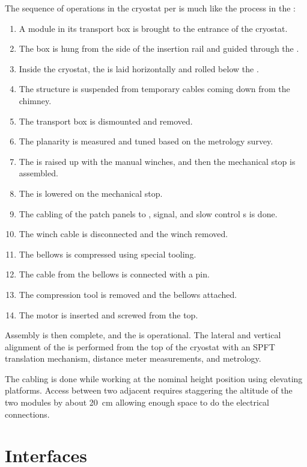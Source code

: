 The sequence of operations in the cryostat per  is much like the process in the : 
\begin{enumerate}
\item A  module in its transport box is brought to the entrance of the cryostat.
\item The box is hung from the side of the insertion rail and guided through the .
\item  Inside the cryostat, the  is laid horizontally and rolled below the .
\item The structure is suspended from temporary cables coming down from the chimney.
\item The transport box is dismounted and removed.
\item The  planarity is measured and tuned based on the metrology survey.
\item The  is raised up with the manual winches, and then the mechanical stop is assembled.
\item The  is lowered on the mechanical stop.
\item The cabling of the  patch panels to , signal, and slow control \fdth{}s is done.
\item The winch cable is disconnected  and the winch removed.
\item The bellows is compressed using special tooling.
\item The cable from the bellows is connected with a pin.
\item The compression tool is removed and the bellows attached.
\item The motor is inserted and screwed from the top.
\end{enumerate}
 

Assembly is then complete, and the  is operational.
The lateral and vertical alignment of the  is performed from the top of the cryostat with an SPFT translation mechanism, distance meter measurements, and metrology.

The cabling is done while working at the nominal height position using elevating platforms. Access between two adjacent  requires staggering the altitude of the two modules by about \SI{20}{cm} allowing enough space to do the electrical connections. 
\section{Interfaces}
\label{sec:dp-crp-interfaces}


